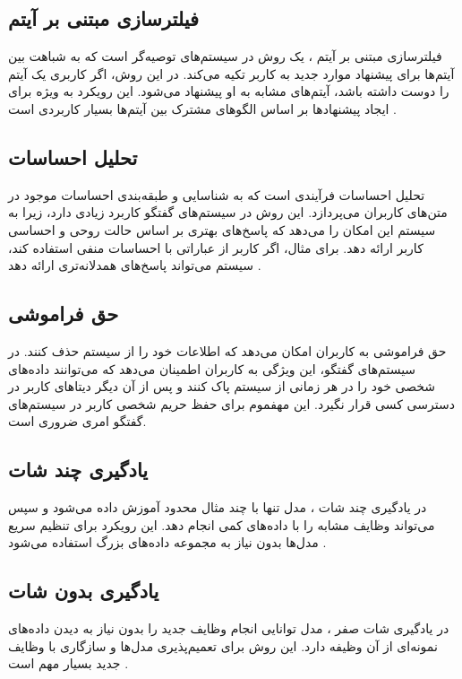 \subsection{فیلترسازی مبتنی بر آیتم} 
فیلترسازی مبتنی بر آیتم%
، یک روش در سیستم‌های توصیه‌گر است که به شباهت بین آیتم‌ها برای پیشنهاد موارد جدید به کاربر تکیه می‌کند. در این روش، اگر کاربری یک آیتم را دوست داشته باشد، آیتم‌های مشابه به او پیشنهاد می‌شود. این رویکرد به ویژه برای ایجاد پیشنهادها بر اساس الگوهای مشترک بین آیتم‌ها بسیار کاربردی است %
\cite{abdalla2023boosting}
.

\subsection{تحلیل احساسات}
تحلیل احساسات%
 فرآیندی است که به شناسایی و طبقه‌بندی احساسات موجود در متن‌های کاربران می‌پردازد. این روش در سیستم‌های گفتگو کاربرد زیادی دارد، زیرا به سیستم این امکان را می‌دهد که پاسخ‌های بهتری بر اساس حالت روحی و احساسی کاربر ارائه دهد. برای مثال، اگر کاربر از عباراتی با احساسات منفی استفاده کند، سیستم می‌تواند پاسخ‌های همدلانه‌تری ارائه دهد %
\cite{pandelea2024towards}
.


\subsection{حق فراموشی}

حق فراموشی%
به کاربران امکان می‌دهد که اطلاعات خود را از سیستم حذف کنند. در سیستم‌های گفتگو، این ویژگی به کاربران اطمینان می‌دهد که می‌توانند داده‌های شخصی خود را در هر زمانی از سیستم پاک کنند و پس از آن دیگر دیتاهای کاربر در دسترسی کسی قرار نگیرد.%
\cite{zhang2024right}
 این مهفموم برای حفظ حریم شخصی کاربر در سیستم‌های گفتگو امری ضروری است.

\subsection{یادگیری چند شات}

در یادگیری چند شات%
، مدل تنها با چند مثال محدود آموزش داده می‌شود و سپس می‌تواند وظایف مشابه را با داده‌های کمی انجام دهد. این رویکرد برای تنظیم سریع مدل‌ها بدون نیاز به مجموعه داده‌های بزرگ استفاده می‌شود %
\cite{chen2023zero}
.

\subsection{یادگیری بدون شات}
در یادگیری شات صفر%
، مدل توانایی انجام وظایف جدید را بدون نیاز به دیدن داده‌های نمونه‌ای از آن وظیفه دارد. این روش برای تعمیم‌پذیری مدل‌ها و سازگاری با وظایف جدید بسیار مهم است %
\cite{chen2023zero}
.



